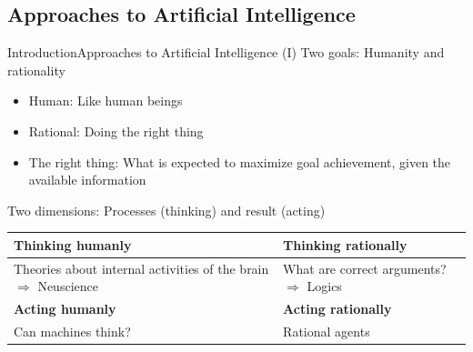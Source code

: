 \documentclass[10pt,compress]{beamer} %
\begin{document}
\subsection{Approaches to Artificial Intelligence}
\begin{frame}{Introduction}{Approaches to Artificial Intelligence (I)}
	Two goals: Humanity and rationality
	\begin{itemize}
		\item Human: Like human beings
		\item Rational: Doing the right thing
		\item The right thing: What is expected to maximize goal achievement, given the available information
	\end{itemize}
	Two dimensions: Processes (thinking) and result (acting)

	\vspace{-0.5cm}
	\begin{center}
	\begin{tabular}{|p{5cm}|p{5cm}|}\hline
	\textbf{Thinking humanly} 	& \textbf{Thinking rationally} \\\hline
	Theories about internal activities of the brain $\Rightarrow$ Neuscience & What are correct arguments? $\Rightarrow$ Logics\\\hline
	\textbf{Acting humanly} & \textbf{Acting rationally} \\\hline
	Can machines think? & Rational agents \\\hline
	\end{tabular}
	\end{center}
\end{frame}
\end{document}
